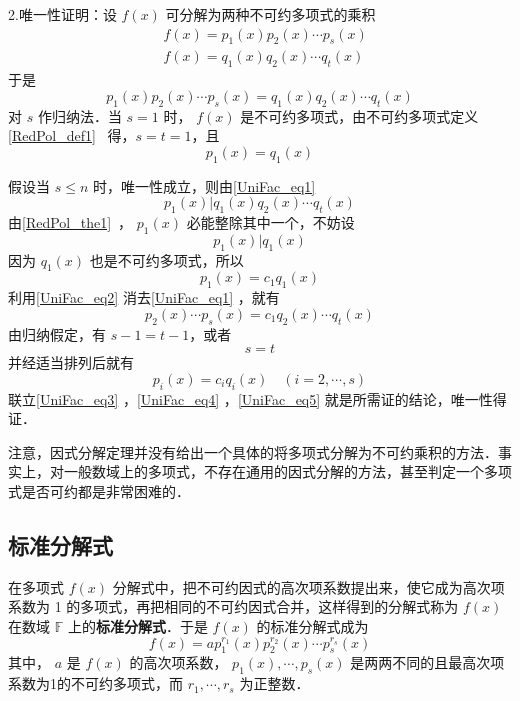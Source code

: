  2.唯一性证明：设 $f(x)$ 可分解为两种不可约多项式的乘积
 \begin{equation}
 \begin{aligned}
 &f(x)=p_1(x)p_2(x)\cdots p_s(x)\\
 &f(x)=q_1(x)q_2(x)\cdots q_t(x)
 \end{aligned}
 \end{equation}
 于是
 \begin{equation}\label{UniFac_eq1}
 p_1(x)p_2(x)\cdots p_s(x)=q_1(x)q_2(x)\cdots q_t(x)
 \end{equation}
 对 $s$ 作归纳法．当 $s=1$ 时， $f(x)$ 是不可约多项式，由不可约多项式定义\autoref{RedPol_def1}~ 得，$s=t=1$，且
 \begin{equation}
 p_1(x)=q_1(x)
 \end{equation}
 
 假设当 $s\leq n$ 时，唯一性成立，则由\autoref{UniFac_eq1} 
 \begin{equation}
 p_1(x)|q_1(x)q_2(x)\cdots q_t(x)
 \end{equation}
 由\autoref{RedPol_the1}~， $p_1(x)$ 必能整除其中一个，不妨设
 \begin{equation}
 p_1(x)|q_1(x)
 \end{equation}
 因为 $q_1(x)$ 也是不可约多项式，所以
 \begin{equation}\label{UniFac_eq2}
 p_1(x)=c_1q_1(x)
 \end{equation}
 利用\autoref{UniFac_eq2} 消去\autoref{UniFac_eq1} ，就有
 \begin{equation}\label{UniFac_eq3}
 p_2(x)\cdots p_s(x)=c_1q_2(x)\cdots q_t(x)
 \end{equation}
 由归纳假定，有 $s-1=t-1$，或者
 \begin{equation}\label{UniFac_eq4}
 s=t
 \end{equation}
 并经适当排列后就有
 \begin{equation}\label{UniFac_eq5}
 p_i(x)=c_iq_i(x)\quad (i=2,\cdots,s)
 \end{equation}
 联立\autoref{UniFac_eq3} ，\autoref{UniFac_eq4} ，\autoref{UniFac_eq5} 就是所需证的结论，唯一性得证．

注意，因式分解定理并没有给出一个具体的将多项式分解为不可约乘积的方法．事实上，对一般数域上的多项式，不存在通用的因式分解的方法，甚至判定一个多项式是否可约都是非常困难的．
\subsection{标准分解式}
在多项式 $f(x)$ 分解式中，把不可约因式的高次项系数提出来，使它成为高次项系数为 1 的多项式，再把相同的不可约因式合并，这样得到的分解式称为 $f(x)$ 在数域 $\mathbb{F}$ 上的\textbf{标准分解式}．于是 $f(x)$ 的标准分解式成为
\begin{equation}
f(x)=ap_1^{r_1}(x)p_2^{r_2}(x)\cdots p_s^{r_s}(x)
\end{equation}
其中， $a$ 是 $f(x)$ 的高次项系数， $p_1(x),\cdots,p_s(x)$ 是两两不同的且最高次项系数为1的不可约多项式，而 $r_1,\cdots ,r_s$ 为正整数．

